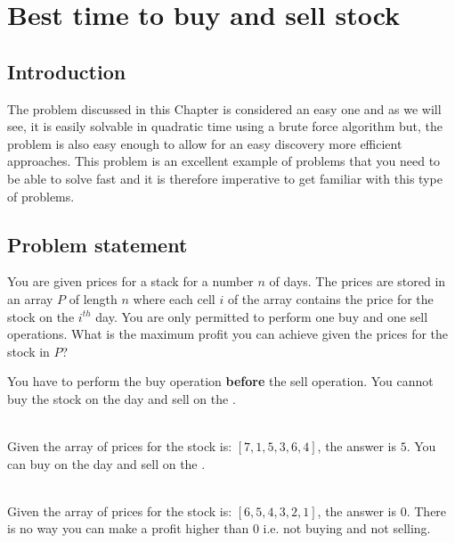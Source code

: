 %

\chapter{Best time to buy and sell stock}
\label{ch:buy_sell_stocks}
\section*{Introduction}
The problem discussed in this Chapter is considered an easy one and as we will see, it is easily solvable in quadratic time using a brute force algorithm but, the problem is also easy enough to allow for an easy discovery more efficient approaches. This problem is an excellent example of problems that you need to be able to solve fast and it is therefore imperative to get familiar with this type of problems.

\section{Problem statement}
\begin{exercise}
You are given prices for a stack for a number $n$ of days. The prices are stored in an array $P$ of length $n$ where each cell $i$ of the array contains the price for the stock on the $i^{th}$ day. You are only permitted to perform one buy and one sell operations. What is the maximum profit you can achieve given the prices for the stock in $P$?

You have to perform the buy operation \textbf{before} the sell operation. You cannot buy the stock on the  day and sell on the .



\begin{example}
	\hfill \\
	Given the array of prices for the stock is: $[7,1,5,3,6,4]$, the answer is $5$. You can buy on the  day and sell on the .
\end{example}

\begin{example}
	\hfill \\
	Given the array of prices for the stock is: $[6,5,4,3,2,1]$, the answer is $0$. There is no way you can make a profit higher than $0$ i.e. not buying and not selling. 
\end{example}

\end{exercise}

